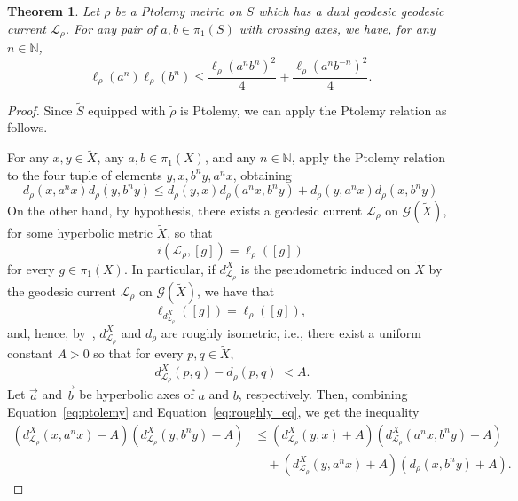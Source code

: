 \documentclass[12pt]{amsart}
\numberwithin{equation}{section}
\numberwithin{figure}{section}
\newtheorem{theorem}[equation]{Theorem}
\theoremstyle{definition}
\theoremstyle{plain}
\newcommand{\ora}[1]{\overrightarrow{#1}}
\newcommand*{\wt}[1]{\widetilde{#1}}
\begin{document}
\begin{theorem}
Let $\rho$ be a Ptolemy metric on $S$ which has a dual geodesic geodesic current $\mathcal{L}_\rho$. For any pair of $a, b \in \pi_1(S)$ with crossing axes, we have, for any $n \in \mathbb{N}$,
\[
\ell_{\rho}(a^n) \ell_{\rho}(b^n) \leq \frac{\ell_{\rho}(a^nb^n)^2}{4} +  \frac{\ell_{\rho}(a^nb^{-n})^2}{4}.
\]
\label{thm:Ptolemy_lengths}
\end{theorem}
\begin{proof}
 Since $\wt{S}$ equipped with $\wt{\rho}$ is Ptolemy, we can apply the Ptolemy relation as follows.

For any $x,y \in \wt{X}$, any $a, b \in \pi_1(X)$, and any $n \in \mathbb{N}$,
apply the Ptolemy relation to the four tuple of elements $y,x, b^n y, a^n x$, obtaining
\begin{equation}
d_{\rho}(x,a^n x)d_{\rho}(y,b^n y) \leq d_{\rho}(y,x) d_{\rho}(a^n x,b^n y) +  d_{\rho}(y,a^n x) d_{\rho}(x,b^n y) 
\label{eq:ptolemy}
\end{equation}
On the other hand, by hypothesis, there exists a geodesic current $\mathcal{L}_\rho$ on $\mathcal{G}(\wt{X})$, for some hyperbolic metric $\wt{X}$, so that
\[
i(\mathcal{L}_\rho, [g]) = \ell_\rho([g])
\]
for every $g \in \pi_1(X)$.
In particular, if $d_{\mathcal{L}_\rho}^{X}$ is the pseudometric induced on $\wt{X}$ by the geodesic current $\mathcal{L}_\rho$ on  $\mathcal{G}(\wt{X})$, we have that
\[
\ell_{d_{\mathcal{L}_\rho}^{X}}([g])=\ell_\rho([g]),
\]
and, hence, by~\cite[Theorem~1.2]{CT25:Manhattan}, $d_{\mathcal{L}_\rho}^{X}$ and $d_\rho$ are roughly isometric, i.e.,
there exist a uniform constant $A>0$ so that for every $p, q \in \wt{X}$,
\begin{equation}
|d_{\mathcal{L}_\rho}^{X}(p,q)-d_\rho(p,q)|<A.
\label{eq:roughly_eq}
\end{equation}
Let $\ora{a}$ and $\ora{b}$ be hyperbolic axes of $a$ and $b$, respectively.
Then, combining Equation~\ref{eq:ptolemy} and Equation~\ref{eq:roughly_eq}, we get the inequality
\begin{equation}
\begin{aligned}
(d_{\mathcal{L}_\rho}^{X}(x,a^n x)-A)(d_{\mathcal{L}_\rho}^{X}(y,b^n y)-A)
&\leq (d_{\mathcal{L}_\rho}^{X}(y,x)+A)( d_{\mathcal{L}_\rho}^{X}(a^n x,b^n y)+A) \\
&\quad + (d_{\mathcal{L}_\rho}^{X}(y,a^n x)+A)(d_{\rho}(x,b^n y)+A).
\end{aligned}
\label{eq:ptolemy2}
\end{equation}


\end{proof}
\end{document}
